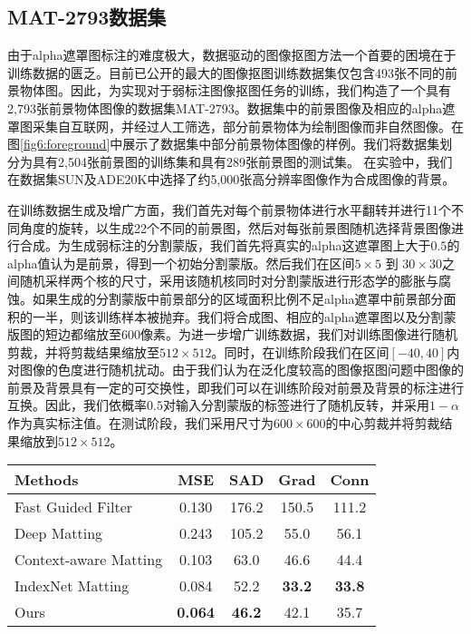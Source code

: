 \subsection{MAT-2793数据集}
\label{sec6:data}
由于alpha遮罩图标注的难度极大，数据驱动的图像抠图方法一个首要的困境在于训练数据的匮乏。目前已公开的最大的图像抠图训练数据集\cite{xu2017deep}仅包含493张不同的前景物体图。因此，为实现对于弱标注图像抠图任务的训练，我们构造了一个具有2,793张前景物体图像的数据集MAT-2793。数据集中的前景图像及相应的alpha遮罩图采集自互联网，并经过人工筛选，部分前景物体为绘制图像而非自然图像。在图\ref{fig6:foreground}中展示了数据集中部分前景物体图像的样例。我们将数据集划分为具有2,504张前景图的训练集和具有289张前景图的测试集。
在实验中，我们在数据集SUN\cite{xiao2010sun}及ADE20K\cite{zhou2017scene}中选择了约5,000张高分辨率图像作为合成图像的背景。

在训练数据生成及增广方面，我们首先对每个前景物体进行水平翻转并进行11个不同角度的旋转，以生成22个不同的前景图，然后对每张前景图随机选择背景图像进行合成。为生成弱标注的分割蒙版，我们首先将真实的alpha这遮罩图上大于$0.5$的alpha值认为是前景，得到一个初始分割蒙版。然后我们在区间$5\times5$ 到 $30\times30$之间随机采样两个核的尺寸，采用该随机核同时对分割蒙版进行形态学的膨胀与腐蚀。如果生成的分割蒙版中前景部分的区域面积比例不足alpha遮罩中前景部分面积的一半，则该训练样本被抛弃。我们将合成图、相应的alpha遮罩图以及分割蒙版图的短边都缩放至600像素。为进一步增广训练数据，我们对训练图像进行随机剪裁，并将剪裁结果缩放至$512\times512$。同时，在训练阶段我们在区间$ [-40, 40] $内对图像的色度进行随机扰动。由于我们认为在泛化度较高的图像抠图问题中图像的前景及背景具有一定的可交换性，即我们可以在训练阶段对前景及背景的标注进行互换。因此，我们依概率$0.5$对输入分割蒙版的标签进行了随机反转，并采用$1-\alpha$作为真实标注值。在测试阶段，我们采用尺寸为$600\times600$的中心剪裁并将剪裁结果缩放到$512\times512$。

\begin{table}[t]
	\setlength{\tabcolsep}{16pt}
	\centering
	\begin{tabular}{lcccc}  
		\toprule
		Methods & MSE & SAD & Grad &Conn\\
		\midrule
		Fast Guided Filter \cite{he2015fast} &  0.130 & 176.2  & 150.5  & 111.2 \\
		Deep Matting \cite{xu2017deep} & 0.243 & 105.2 & 55.0 & 56.1\\
		Context-aware Matting \cite{hou2019context}  & 0.103  & 63.0  & 46.6  & 44.4 \\
		IndexNet Matting \cite{lu2019indices}  & 0.084 & 52.2 & \textbf{33.2} & \textbf{33.8}\\
		Ours & \textbf{0.064} & \textbf{46.2} & {42.1} & {35.7}\\        
		\bottomrule
	\end{tabular}
	\label{tab6:adobe}
\end{table}

